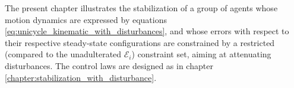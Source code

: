The present chapter illustrates the stabilization of a group of agents whose
motion dynamics are expressed by equations
\eqref{eq:unicycle_kinematic_with_disturbances}, and whose errors with respect
to their respective steady-state configurations are
constrained by a restricted (compared to the unadulterated $\mathcal{E}_{i}$)
constraint set, aiming at attenuating disturbances. The control laws are
designed as in chapter \ref{chapter:stabilization_with_disturbance}.
